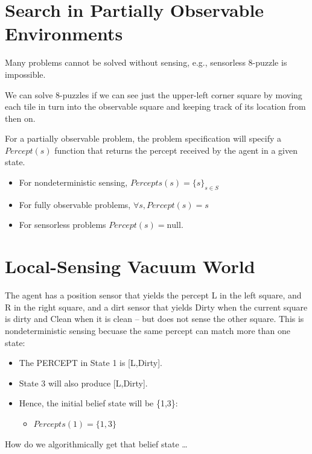 \documentclass[11pt]{article}
\begin{document}
\section{Search in Partially Observable Environments}
\label{sec:orgdc4ad13}

Many problems cannot be solved without sensing, e.g., sensorless 8-puzzle is impossible.

We can solve 8-puzzles if we can see just the upper-left corner square by moving each tile in turn into the observable square and keeping track of its location from then on.

For a partially observable problem, the problem specification will specify a \(Percept(s)\) function that returns the percept received by the agent in a given state.

\begin{itemize}
\item For nondeterministic sensing, \(Percepts(s) = \{s\}_{s \in S}\)
\item For fully observable problems, \(\forall s, Percept(s) = s\)
\item For sensorless problems \(Percept(s) = \text{null}\).
\end{itemize}
\section{Local-Sensing Vacuum World}
\label{sec:orga935d16}




The agent has a position sensor that yields the percept L in the left square, and R in the right square, and a dirt sensor that yields Dirty when the current square is dirty and Clean when it is clean -- but does not sense the other square.  This is nondeterministic sensing becuase the same percept can match more than one state:

\begin{itemize}
\item The PERCEPT in State 1 is [L,Dirty].
\item State 3 will also produce [L,Dirty].
\item Hence, the initial belief state will be \{1,3\}:

\begin{itemize}
\item \(Percepts(1) = \{1, 3\}\)
\end{itemize}
\end{itemize}

How do we algorithmically get that belief state \ldots{}
\end{document}
